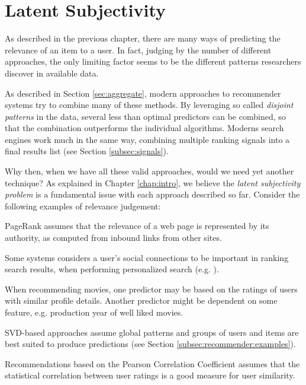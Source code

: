 \section{Latent Subjectivity}
\label{sec:reasoning}

As described in the previous chapter, 
there are many ways of predicting the
relevance of an item to a user. 
In fact, judging by the number of different approaches,
the only limiting factor seems to be the different 
patterns researchers discover in available data.

As described in Section \ref{sec:aggregate},
modern approaches to recommender systems try to combine many of these methods.
By leveraging so called \emph{disjoint patterns}
in the data, several less than optimal predictors
can be combined, so that the combination outperforms the individual algorithms.
Moderns search engines work much in the same way,
combining multiple ranking signals into a final results list
(see Section \ref{subsec:signals}).

Why then, when we have all these valid approaches, would we need yet another technique?
As explained in Chapter \ref{chap:intro}, 
we believe the \emph{latent subjectivity problem}
is a fundamental issue with each approach described so far.
Consider the following examples of relevance judgement:

\begin{itemize*}
  \item PageRank \citep{Bender2005} assumes that the relevance of a web page is 
  represented by its authority, as computed from inbound links from other sites.
  \item Some systems considers a user's social connections to be important
  in ranking search results, when performing personalized search (e.g. \cite{Carmel2009}).
  \item When recommending movies, one predictor may be based on the ratings
  of users with similar profile details. Another predictor might be 
  dependent on some feature, e.g. production year of well liked movies.
  \item SVD-based approaches assume global patterns and groups of users and items
  are best suited to produce predictions (see Section \ref{subsec:recommender:examples}).
  \item Recommendations based on the Pearson Correlation Coefficient \cite[p11]{Segaran2007}
  assumes that the statistical correlation between user ratings is a good
  measure for user similarity.
\end{itemize*}

